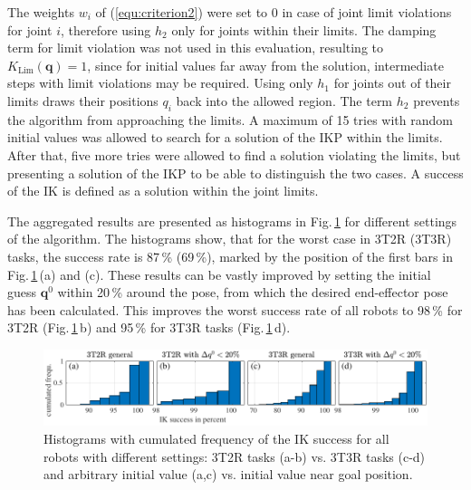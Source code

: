 \documentclass[robotics,article,submit,moreauthors,pdftex]{Definitions/mdpi}
\newcommand{\bm}[1]{\boldsymbol{#1}}
\begin{document}
The weights $w_i$ of (\ref{equ:criterion2}) were set to 0 in case of joint limit violations for joint $i$, therefore using $h_2$ only for joints within their limits.
The damping term for limit violation was not used in this evaluation, resulting to $K_\mathrm{Lim}(\bm{q})=1$, since for initial values far away from the solution, intermediate steps with limit violations may be required.
Using only $h_1$ for joints out of their limits draws their positions $q_i$ back into the allowed region.
The term $h_2$ prevents the algorithm from approaching the limits.
%
A maximum of 15 tries with random initial values was allowed to search for a solution of the IKP within the limits.
After that, five more tries were allowed to find a solution violating the limits, but presenting a solution of the IKP to be able to distinguish the two cases.
A success of the IK is defined as a solution within the joint limits.

The aggregated results are presented as histograms in Fig.\,\ref{fig:serrob_ik_hist_cdf} for different settings of the algorithm.
The histograms show, that for the worst case in 3T2R (3T3R) tasks, the success rate is 87\,\% (69\,\%), marked by the position of the first bars in Fig.\,\ref{fig:serrob_ik_hist_cdf}\,(a) and (c).
These results can be vastly improved by setting the initial guess $\bm{q}^0$ within 20\,\% around the pose, from which the desired end-effector pose has been calculated.
This improves the worst success rate of all robots to 98\,\% for 3T2R (Fig.\,\ref{fig:serrob_ik_hist_cdf}\,b) and 95\,\% for 3T3R tasks (Fig.\,\ref{fig:serrob_ik_hist_cdf}\,d).


%
\begin{figure}[tb]
    \includegraphics{serrob_ik_hist_cdf_all.pdf}
    \caption{Histograms with cumulated frequency of the IK success for all robots with different settings: 3T2R tasks (a-b) vs. 3T3R tasks (c-d) and arbitrary initial value (a,c) vs. initial value near goal position.}
    \label{fig:serrob_ik_hist_cdf}
\end{figure} 
%
\end{document}

